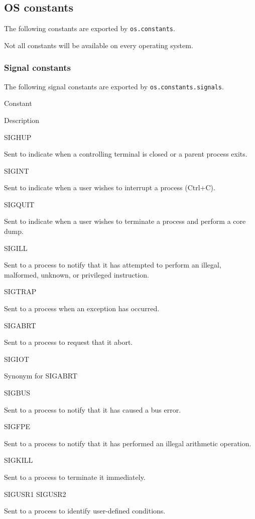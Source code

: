\subsection{OS constants}\label{os-constants}

The following constants are exported by \texttt{os.constants}.

Not all constants will be available on every operating system.

\subsubsection{Signal constants}\label{signal-constants}

The following signal constants are exported by
\texttt{os.constants.signals}.

Constant

Description

SIGHUP

Sent to indicate when a controlling terminal is closed or a parent
process exits.

SIGINT

Sent to indicate when a user wishes to interrupt a process (Ctrl+C).

SIGQUIT

Sent to indicate when a user wishes to terminate a process and perform a
core dump.

SIGILL

Sent to a process to notify that it has attempted to perform an illegal,
malformed, unknown, or privileged instruction.

SIGTRAP

Sent to a process when an exception has occurred.

SIGABRT

Sent to a process to request that it abort.

SIGIOT

Synonym for SIGABRT

SIGBUS

Sent to a process to notify that it has caused a bus error.

SIGFPE

Sent to a process to notify that it has performed an illegal arithmetic
operation.

SIGKILL

Sent to a process to terminate it immediately.

SIGUSR1 SIGUSR2

Sent to a process to identify user-defined conditions.

